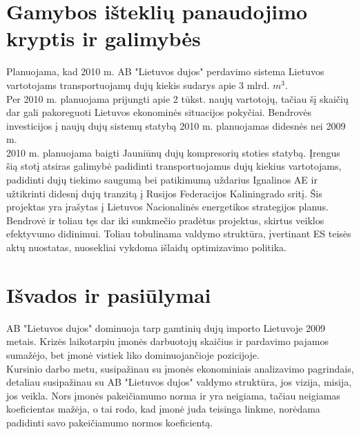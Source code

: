 \documentclass[11pt,a4paper]{article}
\begin{document}
\section{Gamybos išteklių panaudojimo kryptis ir galimybės}

Planuojama, kad 2010 m. AB "Lietuvos dujos" perdavimo sistema Lietuvos vartotojams 
transportuojamų dujų kiekis sudarys apie 3 mlrd. $m^3$.\\

Per 2010 m. planuojama prijungti apie 2 tūkst. naujų vartotojų, tačiau šį skaičių 
dar gali pakoreguoti Lietuvos ekonominės situacijos pokyčiai. Bendrovės investicijos 
į naujų dujų sistemų statybą 2010 m. planuojamas didesnės nei 2009 m.\\

2010 m. planuojama baigti Jauniūnų dujų kompresorių stoties statybą. Įrengus šią stotį 
atsiras galimybė padidinti transportuojamus dujų kiekius vartotojams, padidinti 
dujų tiekimo saugumą bei patikimumą uždarius Ignalinos AE ir užtikrinti didesnį 
dujų tranzitą į Rusijos Federacijos Kaliningrado sritį. Šis projektas yra įrašytas 
į Lietuvos Nacionalinės energetikos strategijos planus.\\

Bendrovė ir toliau tęs dar iki sunkmečio pradėtus projektus, skirtus veiklos efektyvumo 
didinimui. Toliau tobulinama valdymo  struktūra, įvertinant ES teisės aktų nuostatas, 
nuosekliai vykdoma išlaidų optimizavimo politika.\\

\section*{Išvados ir pasiūlymai}

AB "Lietuvos dujos" dominuoja tarp gamtinių dujų importo Lietuvoje 2009 metais. 
Krizės laikotarpiu įmonės darbuotojų skaičius ir pardavimo pajamos sumažėjo, 
bet įmonė vistiek liko dominuojančioje pozicijoje.\\

Kursinio darbo metu, susipažinau su įmonės ekonominiais analizavimo pagrindais, 
detaliau susipažinau su AB "Lietuvos dujos" valdymo struktūra, jos vizija, misija, 
jos veikla. Nors įmonės pakeičiamumo norma ir yra neigiama, tačiau neigiamas 
koeficientas mažėja, o tai rodo, kad įmonė juda teisinga linkme, norėdama 
padidinti savo pakeičiamumo normos koeficientą.\\
\end{document}
